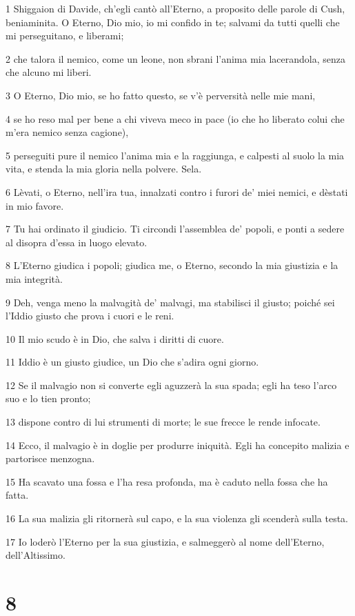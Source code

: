 \par 1 Shiggaion di Davide, ch'egli cantò all'Eterno, a proposito delle parole di Cush, beniaminita. O Eterno, Dio mio, io mi confido in te; salvami da tutti quelli che mi perseguitano, e liberami;
\par 2 che talora il nemico, come un leone, non sbrani l'anima mia lacerandola, senza che alcuno mi liberi.
\par 3 O Eterno, Dio mio, se ho fatto questo, se v'è perversità nelle mie mani,
\par 4 se ho reso mal per bene a chi viveva meco in pace (io che ho liberato colui che m'era nemico senza cagione),
\par 5 perseguiti pure il nemico l'anima mia e la raggiunga, e calpesti al suolo la mia vita, e stenda la mia gloria nella polvere. Sela.
\par 6 Lèvati, o Eterno, nell'ira tua, innalzati contro i furori de' miei nemici, e dèstati in mio favore.
\par 7 Tu hai ordinato il giudicio. Ti circondi l'assemblea de' popoli, e ponti a sedere al disopra d'essa in luogo elevato.
\par 8 L'Eterno giudica i popoli; giudica me, o Eterno, secondo la mia giustizia e la mia integrità.
\par 9 Deh, venga meno la malvagità de' malvagi, ma stabilisci il giusto; poiché sei l'Iddio giusto che prova i cuori e le reni.
\par 10 Il mio scudo è in Dio, che salva i diritti di cuore.
\par 11 Iddio è un giusto giudice, un Dio che s'adira ogni giorno.
\par 12 Se il malvagio non si converte egli aguzzerà la sua spada; egli ha teso l'arco suo e lo tien pronto;
\par 13 dispone contro di lui strumenti di morte; le sue frecce le rende infocate.
\par 14 Ecco, il malvagio è in doglie per produrre iniquità. Egli ha concepito malizia e partorisce menzogna.
\par 15 Ha scavato una fossa e l'ha resa profonda, ma è caduto nella fossa che ha fatta.
\par 16 La sua malizia gli ritornerà sul capo, e la sua violenza gli scenderà sulla testa.
\par 17 Io loderò l'Eterno per la sua giustizia, e salmeggerò al nome dell'Eterno, dell'Altissimo.

\chapter{8}

